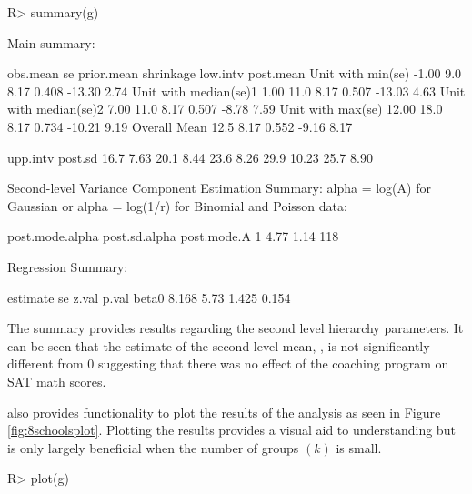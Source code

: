 \documentclass[article]{jss}
\begin{document}
\begin{CodeChunk}
\begin{CodeInput}
R> summary(g)
\end{CodeInput}
\begin{CodeOutput}
Main summary:

                      obs.mean   se prior.mean shrinkage low.intv post.mean
Unit with min(se)        -1.00  9.0       8.17     0.408   -13.30      2.74     
Unit with median(se)1     1.00 11.0       8.17     0.507   -13.03      4.63     
Unit with median(se)2     7.00 11.0       8.17     0.507    -8.78      7.59     
Unit with max(se)        12.00 18.0       8.17     0.734   -10.21      9.19     
Overall Mean                   12.5       8.17     0.552    -9.16      8.17     

                      upp.intv post.sd
                          16.7    7.63
                          20.1    8.44
                          23.6    8.26
                          29.9   10.23
                          25.7    8.90

Second-level Variance Component Estimation Summary:
alpha = log(A) for Gaussian or alpha =  log(1/r) for Binomial and Poisson data:

  post.mode.alpha post.sd.alpha post.mode.A
1            4.77          1.14         118


Regression Summary:

      estimate   se z.val p.val
beta0    8.168 5.73 1.425 0.154
\end{CodeOutput}
\end{CodeChunk}
The summary provides results regarding the second level hierarchy parameters. It can be seen that the estimate of the second level mean, , is not significantly different from 0 suggesting that there was no effect of the coaching program on SAT math scores. 


 also provides functionality to plot the results of the analysis as seen in Figure \ref{fig:8schoolsplot}. Plotting the results provides a visual aid to understanding but is only largely beneficial when the number of groups $(k)$ is small.

\begin{CodeChunk}
\begin{CodeInput}
R> plot(g)
\end{CodeInput}
\end{CodeChunk}
\end{document}
